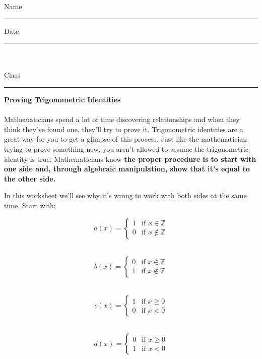 \documentclass[12pt]{article}
\begin{document}
\noindent Name \rule{80 mm}{.2pt} \hspace{35 mm} Date \rule{25 mm}{.2pt}\\\\
Class \rule{30 mm}{.2pt} \hspace{15 mm}\textbf{Proving Trigonometric Identities}\\\\
Mathematicians spend a lot of time discovering relationships and when they think they've found one, they'll try
to prove it. Trigonometric identities are a great way for you to get a glimpse of this process. Just like the
mathematician trying to prove something new, you aren't allowed to assume the trigonometric identity is true.
Mathematicians know \textbf{the proper procedure is to start with one side and, through algebraic manipulation,
show that it's equal to the other side.}

In this worksheet we'll see why it's wrong to work with both sides at the same time. Start with:

	\begin{minipage}[h]{.1 \textwidth}
	\vspace{0pt}	%
	\[a(x)=\left\{ \begin{array}{ll} 1 & \mbox{if $x \in \mathbb{Z}$}\\
		0 & \mbox{if $x \not \in \mathbb{Z}$} \end{array}\right.\]\\
	\end{minipage}%
	\begin{minipage}[h]{1 \textwidth}
	\vspace{0pt}	%
 	\[b(x)=\left\{ \begin{array}{ll} 0 & \mbox{if $x \in \mathbb{Z}$}\\
		1 & \mbox{if $x \not \in \mathbb{Z}$} \end{array}\right.\]\\
	\end{minipage}
		
	\begin{minipage}[h]{.1\textwidth}
	\vspace{0pt}	%
 	\[c(x)=\left\{ \begin{array}{ll} 1 & \mbox{if $x \geq 0$}\\
		0 & \mbox{if $x < 0$} \end{array}\right.\]\\
	\end{minipage}
	\begin{minipage}[h]{1\textwidth}
	\vspace{0pt}	%
 	\[d(x)=\left\{ \begin{array}{ll} 0 & \mbox{if $x \geq 0$}\\
		1 & \mbox{if $x < 0$} \end{array}\right.\]\\
	\end{minipage}
\end{document}
